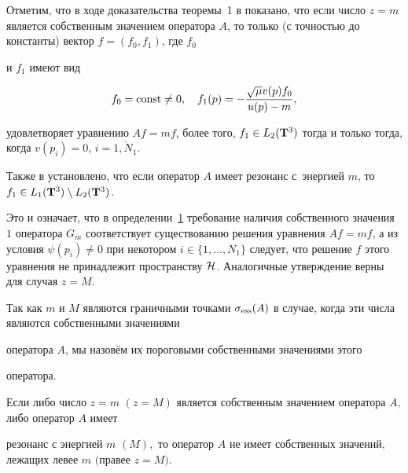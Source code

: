 Отметим, что в ходе доказательства теоремы~1 в \cite{RD:bib:RT} показано, что если число $z=m$ является собственным значением оператора $A$, то только (с точностью до константы) вектор $f=(f_0, f_1)$, где $f_0$

и $f_1$ имеют вид

\begin{equation}

f_0={\rm const} \neq 0, \quad

f_1(p)=-\frac{\sqrt{\mu}v(p)f_0}{u(p)-m}, \label{eq:RD:12}

\end{equation}

удовлетворяет уравнению $Af=mf$, более того, $f_1 \in L_2({\bf

T}^3)$ тогда и только тогда, когда $v(p_i) = 0$, $i=\overline{1,

N_1}$. 

Также в \cite{RD:bib:RT}  установлено, что если оператор $A$ имеет резонанс с~энергией $m$, то $f_1\in L_1({\bf T}^3)\setminus L_2({\bf T}^3)$.

Это и означает, что в определении~\hyperlink{RD:def1}{1} требование наличия собственного значения~$1$ оператора $G_m$ соответствует существованию решения уравнения $Af=mf$, а из условия $\psi(p_i)\neq 0$ при некотором $i\in \{1, \dots, N_1\}$ следует, что решение $f$ этого уравнения не принадлежит пространству ${\cal H}$. Аналогичные утверждение верны для случая $z=M$.



Так как $m$ и $M$ являются граничными точками $\sigma_{\rm

ess}(A)$ в случае, когда эти числа являются собственными значениями

оператора $A$, мы назовём их пороговыми собственными значениями этого

оператора.



\smallskip



\hypertarget{RD:lemma4}{}



\begin{lemma}[4]Если либо число $z=m$ $(z=M)$ является собственным значением оператора $A,$ либо оператор $A$ имеет 

резонанс с энергией $m$ $(M),$ то оператор $A$ не имеет  собственных значений$,$ лежащих левее $m$ $($правее $z=M).$

\end{lemma}



